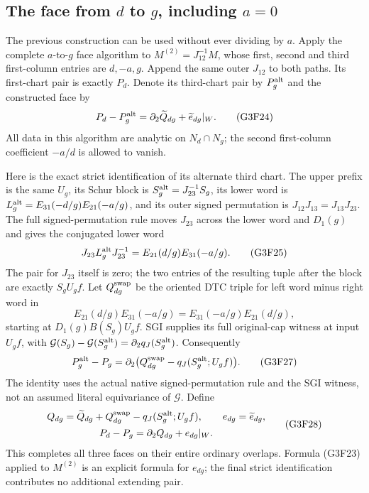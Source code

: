 \subsection{The face from $d$ to $g$, including $a=0$}

The previous construction can be used without ever dividing by
$a$.  Apply the complete $a$-to-$g$ face algorithm to
$M^{(2)}=J_{12}^{-1}M$, whose first, second and third first-column
entries are $d,-a,g$.  Append the same outer $J_{12}$ to both paths.
Its first-chart pair is exactly $P_d$.  Denote its third-chart pair
by $P_g^{\rm alt}$ and the constructed face by
\[
 P_d-P_g^{\rm alt}=\partial_2\widetilde Q_{dg}
                                     +\widetilde e_{dg}|_W.
 \tag{G3F24}
\]
All data in this algorithm are analytic on $N_d\cap N_g$;
the second first-column coefficient $-a/d$ is allowed to vanish.

Here is the exact strict identification of its alternate third chart.
The upper prefix is the same $U_g$, its Schur block is
$S_g^{\rm alt}=J_{23}^{-1}S_g$, its lower word is
$L_g^{\rm alt}=E_{31}(-d/g)E_{21}(-a/g)$, and its outer signed
permutation is $J_{12}J_{13}=J_{13}J_{23}$.
The full signed-permutation rule moves $J_{23}$ across the lower
word and $D_1(g)$ and gives the conjugated lower word
\[
 J_{23}L_g^{\rm alt}J_{23}^{-1}
                  =E_{21}(d/g)E_{31}(-a/g).
 \tag{G3F25}
\]
The pair for $J_{23}$ itself is zero; the two entries of the
resulting tuple after the block are exactly $S_gU_gf$.
Let $Q^{\rm swap}_{dg}$ be the oriented DTC triple for left word
minus right word in
\[
 E_{21}(d/g)E_{31}(-a/g)
                   =E_{31}(-a/g)E_{21}(d/g),
 \tag{G3F26}
\]
starting at $D_1(g)B(S_g)U_gf$.  SGI supplies its full original-cap
witness at input $U_gf$, with
$\mathcal G(S_g)-\mathcal G(S_g^{\rm alt})
 =\partial_2q_J(S_g^{\rm alt})$.
Consequently
\[
 P_g^{\rm alt}-P_g
   =\partial_2\bigl(Q^{\rm swap}_{dg}-q_J(S_g^{\rm alt};U_gf)\bigr).
 \tag{G3F27}
\]
The identity uses the actual native signed-permutation rule and
the SGI witness, not an assumed literal equivariance of $\mathcal G$.
Define
\[
 \begin{gathered}
 Q_{dg}=\widetilde Q_{dg}+Q^{\rm swap}_{dg}
                                   -q_J(S_g^{\rm alt};U_gf),\qquad
 e_{dg}=\widetilde e_{dg},\\
                         P_d-P_g=\partial_2Q_{dg}+e_{dg}|_W.
 \end{gathered}
 \tag{G3F28}
\]
This completes all three faces on their entire ordinary overlaps.
Formula (G3F23) applied to $M^{(2)}$ is an explicit formula for
$e_{dg}$; the final strict identification contributes no additional
extending pair.

